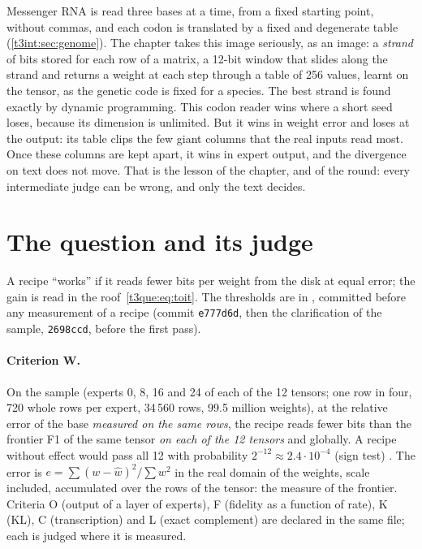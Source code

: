 \begin{enbref}
Messenger RNA is read three bases at a time, from a fixed starting point, without commas, and each codon is translated by a fixed and degenerate table (\cref{t3int:sec:genome}). The chapter takes this image seriously, as an image: a \emph{strand} of bits stored for each row of a matrix, a 12-bit window that slides along the strand and returns a weight at each step through a table of 256 values, learnt on the tensor, as the genetic code is fixed for a species. The best strand is found exactly by dynamic programming. This codon reader wins where a short seed loses, because its dimension is unlimited. But it wins in weight error and loses at the output: its table clips the few giant columns that the real inputs read most. Once these columns are kept apart, it wins in expert output, and the divergence on text does not move. That is the lesson of the chapter, and of the round: every intermediate judge can be wrong, and only the text decides.
\end{enbref}

\section{The question and its judge}\label{t3gen:sec:question}

A recipe ``works'' if it reads fewer bits per weight from the disk at equal error; the gain is read in the roof~\eqref{t3que:eq:toit}. The thresholds are in , committed before any measurement of a recipe (commit \texttt{e777d6d}, then the clarification of the sample, \texttt{2698ccd}, before the first pass).

\paragraph{Criterion W.} On the sample (experts 0, 8, 16 and 24 of each of the 12 tensors; one row in four, 720 whole rows per expert, 34\,560 rows, 99.5 million weights), at the relative error of the base \emph{measured on the same rows}, the recipe reads fewer bits than the frontier F1 of the same tensor \emph{on each of the 12 tensors} and globally. A recipe without effect would pass all 12 with probability $2^{-12} \approx 2.4\cdot10^{-4}$ (sign test) \calc. The error is $e = \sum (w - \hat w)^2 / \sum w^2$ in the real domain of the weights, scale included, accumulated over the rows of the tensor: the measure of the frontier. Criteria O (output of a layer of experts), F (fidelity as a function of rate), K (KL), C (transcription) and L (exact complement) are declared in the same file; each is judged where it is measured.


